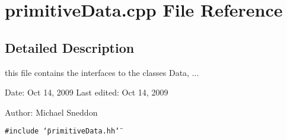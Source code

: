 \section{primitiveData.cpp File Reference}
\label{primitiveData_8cpp}


\subsection{Detailed Description}
this file contains the interfaces to the classes Data, ...

\begin{Desc}
\item[Date:]Oct 14, 2009 Last edited: Oct 14, 2009\end{Desc}
\begin{Desc}
\item[Author:]Michael Sneddon \end{Desc}


{\tt \#include \char`\"{}primitiveData.hh\char`\"{}}\par
